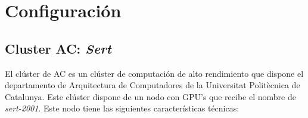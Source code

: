 \begin{table}[H]
    \centering
    \caption[Opciones que nos ofrece \textit{lit-gpt}]{Opciones que nos ofrece \textit{lit-gpt} (Elaboración propia)}
    \label{tab:opciones_litgpt}
\end{table}

\section{Configuración}
\label{sec:configuracion}

\subsection{Cluster AC: \textit{Sert}}
\label{subsec:cluster_ac}


El clúster de AC es un clúster de computación de alto rendimiento que dispone el departamento
de Arquitectura de Computadores de la Universitat Politècnica de Catalunya. Este clúster dispone
de un nodo con GPU's que recibe el nombre de \textit{sert-2001}. Este nodo tiene las siguientes
características técnicas:

